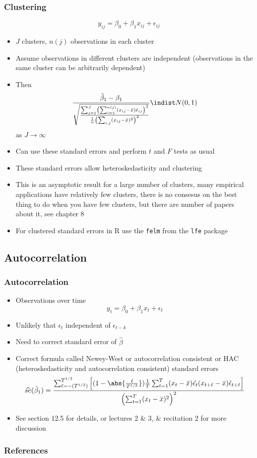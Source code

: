 \begin{frame}[allowframebreaks]\frametitle{Clustering}
  \[ y_{ij} = \beta_0 + \beta_1 x_{ij} + \epsilon_{ij} \]
  \begin{itemize}
  \item $J$ clusters, $n(j)$ observations in each cluster
  \item Assume observations in different clusters are independent
    (observations in the same cluster can be arbitrarily dependent)
  \item Then 
    \[ 
      \frac{\hat{\beta}_1 - \beta_1 }
      {\sqrt{\frac{\sum_{j=1}^J \left(\sum_{i=1}^{n(j)} (x_{ij} - \bar{x})
              \hat{\epsilon}_{ij} \right)^2} { \frac{1}{n} \left(\sum_{i,j} (x_{ij} -
              \bar{x})^2 \right)^2 }}} \indist N(0,1) \]
    as $J \to \infty$
  \item Can use these standard errors and perform $t$ and $F$ tests
    as usual
  \item These standard errors allow heteroskedasticity and clustering
  \item This is an asymptotic result for a large number of clusters,
    many empirical applications have relatively few clusters, there
    is no consesus on the best thing to do when you have few
    clusters, but there are number of papers about it, see
    \cite{ap2009} chapter 8
  \item For clustered standard errors in R use the \lstinline!felm!
    from the \lstinline!lfe! package
  \end{itemize}
\end{frame}

\subsection{Autocorrelation}

\begin{frame}\frametitle{Autocorrelation}
  \begin{itemize}
  \item Observations over time
    \[ y_t = \beta_0 + \beta_1 x_t + \epsilon_t \]
  \item Unlikely that $\epsilon_t$ independent of $\epsilon_{t-k}$
  \item Need to correct standard error of $\hat{\beta}$ 
  \item Correct formula called \alert{Newey-West} or
    \alert{autocorrelation consistent} or \alert{HAC}
    (heteroskedasticity and autocorrelation consistent) standard
    errors
    \[ \widehat{se}(\hat{\beta}_1) =
    \frac{\sum_{\ell=-(T^{1/3})}^{T^{1/3}} \left[ (1 -
        \abs{\frac{\ell}{T^{1/3}}}) \frac{1}{T} \sum_{t=1}^T (x_t -
        \bar{x}) \hat{\epsilon_t}(x_{t+\ell} -
        \bar{x})\hat{\epsilon}_{t+\ell} \right] }
      { \left(\sum_{t=1}^T (x_t - \bar{x})^2\right)^2} \]
  \item See \citet{w2013} section 12.5 for details, or
    \citet{mikusheva2007} lectures 2 \& 3, \& recitation 2 for more
    discussion
  \end{itemize}
\end{frame}




\begin{frame}[allowframebreaks]
  \frametitle{References}


\end{frame}
  

